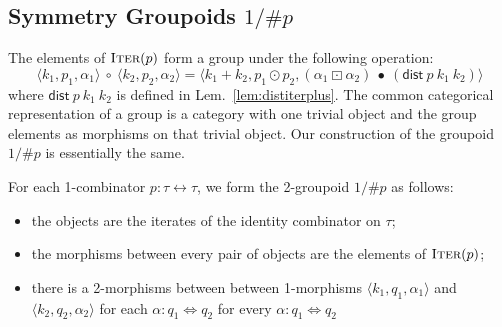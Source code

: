 \documentclass[a4paper,USenglish]{lipics-v2016-utf8x}
\newcommand{\hash}{\#}
\newcommand{\iso}{\leftrightarrow}
\newcommand{\isotwo}{\Leftrightarrow}
\newcommand{\iorder}[1]{1/\hash #1}
\newcommand{\iter}[1]{\textsc{Iter}(#1)}
\newcommand{\triple}[3]{\langle #1,#2,#3 \rangle}
\newcommand{\distiterplus}[3]{\mathsf{dist}~#1~#2~#3}
\newcommand{\permtwo}{\mathit{perm}_{\times\!\times.}}
\newcommand{\idiso}{\mathsf{{id}}}
\newcommand{\idisotwo}{\mathsf{{id}}}
\newcommand{\transtwo}{\bullet}
\newcommand{\respstwo}{\mathsf{{\boxdot}}}
\begin{document}
\begin{center}
\end{center}

\subsection{Symmetry Groupoids $\iorder{p}$}\label{sec:symmetryg}

The elements of $\iter{p}$ form a group under the following operation:
\[
\triple{k_1}{p_1}{\alpha_1} ~\circ~ \triple{k_2}{p_2}{\alpha_2} =
 \triple{k_1+k_2}{p_1 \odot p_2}{(\alpha_1 ~\respstwo~
    \alpha_2)~\transtwo~(\distiterplus{p}{k_1}{k_2})}
\]
where $\distiterplus{p}{k_1}{k_2}$ is defined in
Lem.~\ref{lem:distiterplus}. The common categorical representation of a group is
a category with one trivial object and the group elements as morphisms on that
trivial object. Our construction of the groupoid $\iorder{p}$ is essentially the
same.

\begin{definition}[$\iorder{p}$] For each 1-combinator $p : \tau\iso\tau$, we form the 2-groupoid $\iorder{p}$ as follows:
\begin{itemize}
\item the objects are the iterates of the identity combinator on $\tau$;
\item the morphisms between every pair of objects are the elements of $\iter{p}$;
\item there is a 2-morphisms between between 1-morphisms $\triple{k_1}{q_1}{\alpha_1}$ and $\triple{k_2}{q_2}{\alpha_2}$ for each $\alpha : q_1 \isotwo q_2$ for every $\alpha : q_1 \isotwo q_2$
\end{itemize}
\end{definition}
\end{document}
